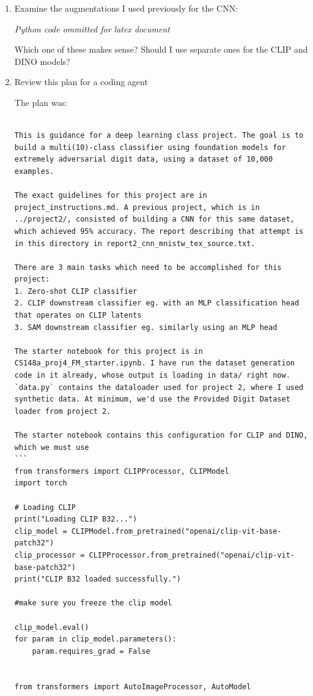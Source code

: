 \documentclass[11pt]{article}
\begin{document}
\begin{enumerate}
\item Examine the augmentations I used previously for the CNN:

\textit{Python code ommitted for latex document}

Which one of these makes sense? Should I use separate ones for the CLIP and DINO models?

\item Review this plan for a coding agent

The plan was:
\begin{verbatim}
    
This is guidance for a deep learning class project. The goal is to build a multi(10)-class classifier using foundation models for extremely adversarial digit data, using a dataset of 10,000 examples.

The exact guidelines for this project are in project_instructions.md. A previous project, which is in ../project2/, consisted of building a CNN for this same dataset, which achieved 95% accuracy. The report describing that attempt is in this directory in report2_cnn_mnistw_tex_source.txt.

There are 3 main tasks which need to be accomplished for this project:
1. Zero-shot CLIP classifier
2. CLIP downstream classifier eg. with an MLP classification head that operates on CLIP latents
3. SAM downstream classifier eg. similarly using an MLP head

The starter notebook for this project is in CS148a_proj4_FM_starter.ipynb. I have run the dataset generation code in it already, whose output is loading in data/ right now. `data.py` contains the dataloader used for project 2, where I used synthetic data. At minimum, we'd use the Provided Digit Dataset loader from project 2. 

The starter notebook contains this configuration for CLIP and DINO, which we must use
```
from transformers import CLIPProcessor, CLIPModel
import torch

# Loading CLIP
print("Loading CLIP B32...")
clip_model = CLIPModel.from_pretrained("openai/clip-vit-base-patch32")
clip_processor = CLIPProcessor.from_pretrained("openai/clip-vit-base-patch32")
print("CLIP B32 loaded successfully.")

#make sure you freeze the clip model

clip_model.eval()
for param in clip_model.parameters():
    param.requires_grad = False


from transformers import AutoImageProcessor, AutoModel


\end{verbatim}
\end{enumerate}
\end{document}

